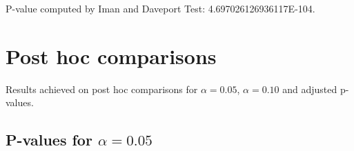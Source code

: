 \documentclass[a4paper,10pt]{article}
\begin{document}
\begin{landscape}
P-value computed by Iman and Daveport Test: 4.697026126936117E-104.\newline



\pagebreak

\section{Post hoc comparisons}

Results achieved on post hoc comparisons for $\alpha = 0.05$, $\alpha = 0.10$ and adjusted p-values.

\subsection{P-values for $\alpha=0.05$}


\end{landscape}
\end{document}
